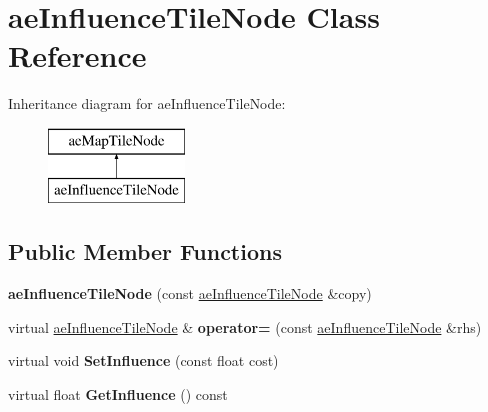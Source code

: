 \hypertarget{classae_influence_tile_node}{}\section{ae\+Influence\+Tile\+Node Class Reference}
\label{classae_influence_tile_node}
Inheritance diagram for ae\+Influence\+Tile\+Node\+:\begin{figure}[H]
\begin{center}
\leavevmode
\includegraphics[height=2.000000cm]{classae_influence_tile_node}
\end{center}
\end{figure}
\subsection*{Public Member Functions}
\begin{DoxyCompactItemize}
\item 
{\bfseries ae\+Influence\+Tile\+Node} (const \hyperlink{classae_influence_tile_node}{ae\+Influence\+Tile\+Node} \&copy)\hypertarget{classae_influence_tile_node_a415b33425cedb8c0558d61d120b96fc9}{}\label{classae_influence_tile_node_a415b33425cedb8c0558d61d120b96fc9}

\item 
virtual \hyperlink{classae_influence_tile_node}{ae\+Influence\+Tile\+Node} \& {\bfseries operator=} (const \hyperlink{classae_influence_tile_node}{ae\+Influence\+Tile\+Node} \&rhs)\hypertarget{classae_influence_tile_node_aef399505bbf95bcc118b4c83c9181d3a}{}\label{classae_influence_tile_node_aef399505bbf95bcc118b4c83c9181d3a}

\item 
virtual void {\bfseries Set\+Influence} (const float cost)\hypertarget{classae_influence_tile_node_af25e541924861a55467bdd81a53fd347}{}\label{classae_influence_tile_node_af25e541924861a55467bdd81a53fd347}

\item 
virtual float {\bfseries Get\+Influence} () const \hypertarget{classae_influence_tile_node_a3b86d1584e70e8fb4228aed0b24309bf}{}\label{classae_influence_tile_node_a3b86d1584e70e8fb4228aed0b24309bf}

\end{DoxyCompactItemize}
